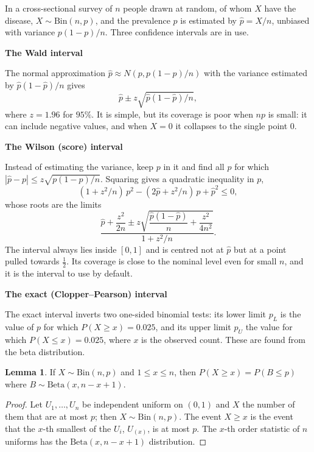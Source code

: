 \documentclass[11pt,a4paper]{article}
\numberwithin{equation}{section}
\theoremstyle{definition}
\newtheorem{lem}[thm]{Lemma}
\newcommand{\subhead}[1]{%
  \par\medskip\noindent\textbf{#1}\par\nobreak\smallskip}
\begin{document}
In a cross-sectional survey of $n$ people drawn at random, of whom $X$ have the disease, $X \sim \text{Bin}(n, p)$, and the prevalence $p$ is
estimated by $\hat p = X/n$, unbiased with variance $p(1 - p)/n$. Three confidence intervals are in use.

\subhead{The Wald interval}

The normal approximation $\hat p \approx N(p, p(1 - p)/n)$ with the variance estimated by $\hat p(1 - \hat p)/n$ gives
\[
\hat p \pm z \sqrt{\hat p(1 - \hat p)/n} ,
\]
where $z = 1.96$ for $95\%$. It is simple, but its coverage is poor when $np$ is small: it can include negative values, and when $X = 0$ it
collapses to the single point $0$.

\subhead{The Wilson (score) interval}

Instead of estimating the variance, keep $p$ in it and find all $p$ for which $|\hat p - p| \leq z\sqrt{p(1 - p)/n}$. Squaring gives a quadratic
inequality in $p$,
\[
(1 + z^2/n)\,p^2 - (2\hat p + z^2/n)\,p + \hat p^2 \leq 0 ,
\]
whose roots are the limits
\begin{equation}
\label{eq:wilson}
\frac{\hat p + \dfrac{z^2}{2n} \pm z\sqrt{\dfrac{\hat p(1 - \hat p)}{n} + \dfrac{z^2}{4n^2}}}{1 + z^2/n} .
\end{equation}
The interval always lies inside $[0, 1]$ and is centred not at $\hat p$ but at a point pulled towards $\tfrac12$. Its coverage is close to
the nominal level even for small $n$, and it is the interval to use by default.

\subhead{The exact (Clopper--Pearson) interval}

The exact interval inverts two one-sided binomial tests: its lower limit $p_L$ is the value of $p$ for which $P(X \geq x) = 0.025$, and its
upper limit $p_U$ the value for which $P(X \leq x) = 0.025$, where $x$ is the observed count. These are found from the beta distribution.

\begin{lem}
\label{lem:binbeta}
If $X \sim \text{Bin}(n, p)$ and $1 \leq x \leq n$, then $P(X \geq x) = P(B \leq p)$ where $B \sim \text{Beta}(x, n - x + 1)$.
\end{lem}

\begin{proof}
Let $U_1, \dots, U_n$ be independent uniform on $(0, 1)$ and $X$ the number of them that are at most $p$; then $X \sim \text{Bin}(n, p)$. The event $X \geq x$
is the event that the $x$-th smallest of the $U_i$, $U_{(x)}$, is at most $p$. The $x$-th order statistic of $n$ uniforms has the
$\text{Beta}(x, n - x + 1)$ distribution.
\end{proof}
\end{document}
